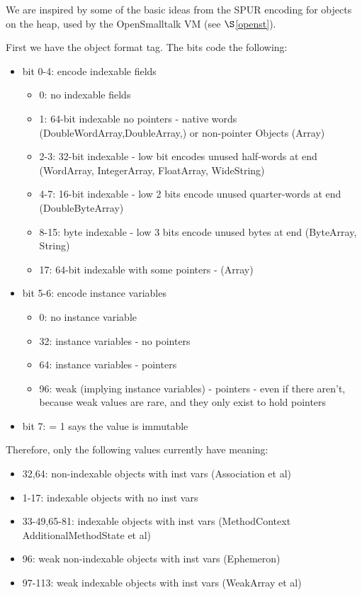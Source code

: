\documentclass[
]{ceurart}
\def\secref{$\S$\ref}
\begin{document}
We are inspired by some of the basic ideas from the SPUR\cite{spur-memory} encoding for objects on the heap, used by the OpenSmalltalk VM (see \secref{openst}).

First we have the object format tag. The bits code the following:
\begin{itemize}
\item bit 0-4: encode indexable fields
\begin{itemize}
	\item 0: no indexable fields
	\item 1: 64-bit indexable no pointers - native words (DoubleWordArray,DoubleArray,) or non-pointer Objects (Array)
	\item 2-3: 32-bit indexable - low bit encodes unused half-words at end (WordArray, IntegerArray, FloatArray, WideString)
	\item 4-7: 16-bit indexable - low 2 bits encode unused quarter-words at end (DoubleByteArray)
	\item 8-15: byte indexable - low 3 bits encode unused bytes at end (ByteArray, String)
	\item 17: 64-bit indexable with some pointers - (Array)
\end{itemize}
\item bit 5-6: encode instance variables
\begin{itemize}
	\item  0: no instance variable
	\item 32: instance variables - no pointers
	\item 64: instance variables - pointers
	\item 96: weak (implying instance variables) - pointers - even if there aren't, because weak values are rare, and they only exist to hold pointers
\end{itemize}
\item bit 7: = 1 says the value is immutable
\end{itemize}

Therefore, only the following values currently have meaning:
\begin{itemize}
\item 32,64: non-indexable objects with inst vars (Association et al) 
\item 1-17: indexable objects with no inst vars
\item 33-49,65-81: indexable objects with inst vars (MethodContext AdditionalMethodState et al)
\item 96: weak non-indexable objects with inst vars  (Ephemeron)
\item 97-113: weak indexable objects with inst vars (WeakArray et al)
\end{itemize}
\end{document}
